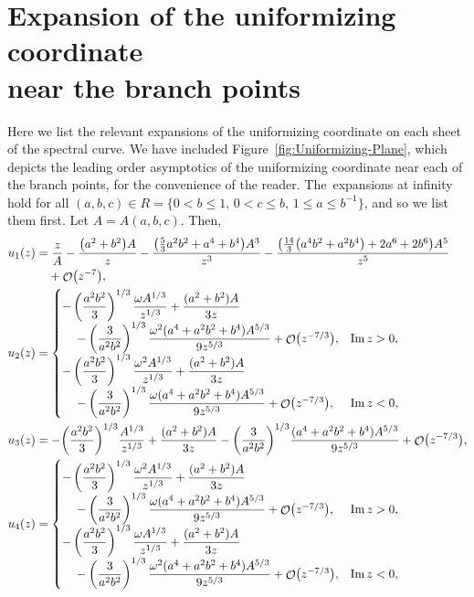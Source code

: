 \documentclass[pdftex]{sigma}
\DeclareMathOperator{\OO}{\mathcal{O}}
\numberwithin{equation}{section}
\begin{document}
\section{Expansion of the uniformizing coordinate \\ near the branch points} \label{Appendix-A}
Here we list the relevant expansions of the uniformizing coordinate on each sheet of the spectral curve. We have included Figure~\ref{fig:Uniformizing-Plane}, which depicts the leading order asymptotics of the uniformizing coordinate near each of the branch points, for the convenience of the reader. The~expansions at infinity hold for all $(a,b,c) \in R = \{0<b\leq 1,\, 0< c\leq b,\, 1 \leq a \leq b^{-1}\}$, and so we list them first. Let $A= A(a,b,c)$. Then,
\begin{align*}
 &u_1(z)= \frac{z}{A} - \frac{\bigl(a^2+b^2\bigr)A}{z} - \frac{\bigl(\frac{5}{3}a^2b^2 + a^4 + b^4\bigr)A^3}{z^3} - \frac{\bigl(\frac{14}{3}\bigl(a^4b^2 + a^2b^4\bigr) + 2a^6+ 2b^6\bigr)A^5}{z^5}\\
 & \hphantom{u_1(z)=}{}
 + \OO\bigl(z^{-7}\bigr),\\
 &u_2(z)=
 \begin{cases}
 -\left(\dfrac{a^2b^2}{3}\right)^{1/3} \dfrac{\omega A^{1/3}}{z^{1/3}} + \dfrac{(a^2+b^2)A}{3z} &\\
 \quad{}- \left(\dfrac{3}{a^2b^2}\right)^{1/3} \dfrac{\omega^2(a^4+a^2b^2+b^4)A^{5/3}}{9z^{5/3}} + \OO\bigl(z^{-7/3}\bigr), & \operatorname{Im}z >0,\\[1mm]
 -\left(\dfrac{a^2b^2}{3}\right)^{1/3} \dfrac{\omega^2 A^{1/3}}{z^{1/3}} + \dfrac{(a^2+b^2)A}{3z} &\\
 \quad{} - \left(\dfrac{3}{a^2b^2}\right)^{1/3} \dfrac{\omega(a^4+a^2b^2+b^4)A^{5/3}}{9z^{5/3}} + \OO\bigl(z^{-7/3}\bigr), & \operatorname{Im}z <0,
 \end{cases}\\
 &u_3(z)= -\biggl(\frac{a^2b^2}{3}\biggr)^{1/3} \frac{A^{1/3}}{z^{1/3}} + \frac{(a^2+b^2)A}{3z} - \biggl(\frac{3}{a^2b^2}\biggr)^{1/3} \frac{(a^4+a^2b^2+b^4)A^{5/3}}{9z^{5/3}} + \OO\bigl(z^{-7/3}\bigr),\\
 &u_4(z)=
 \begin{cases}
 -\left(\dfrac{a^2b^2}{3}\right)^{1/3} \dfrac{\omega^2 A^{1/3}}{z^{1/3}} + \dfrac{(a^2+b^2)A}{3z} &\\
 \quad{}- \left(\dfrac{3}{a^2b^2}\right)^{1/3} \dfrac{\omega(a^4+a^2b^2+b^4)A^{5/3}}{9z^{5/3}} + \OO\bigl(z^{-7/3}\bigr), & \operatorname{Im}z >0,\\[1mm]
 -\left(\dfrac{a^2b^2}{3}\right)^{1/3} \dfrac{\omega A^{1/3}}{z^{1/3}} + \dfrac{(a^2+b^2)A}{3z} &\\
 \quad{}- \left(\dfrac{3}{a^2b^2}\right)^{1/3} \dfrac{\omega^2(a^4+a^2b^2+b^4)A^{5/3}}{9z^{5/3}} + \OO\bigl(z^{-7/3}\bigr), & \operatorname{Im}z <0,
 \end{cases}
\end{align*}
\end{document}
